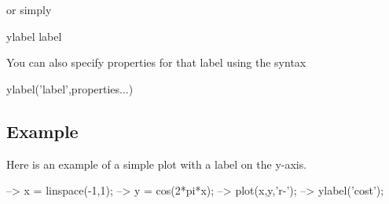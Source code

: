  or simply \begin{DoxyVerb}  ylabel label
\end{DoxyVerb}
 You can also specify properties for that label using the syntax \begin{DoxyVerb}  ylabel('label',properties...) 
\end{DoxyVerb}
 \hypertarget{variables_struct_Example}{}\subsection{Example}\label{variables_struct_Example}
Here is an example of a simple plot with a label on the {\ttfamily y}-\/axis.


\begin{DoxyVerbInclude}
--> x = linspace(-1,1);
--> y = cos(2*pi*x);
--> plot(x,y,'r-');
--> ylabel('cost');
\end{DoxyVerbInclude}



